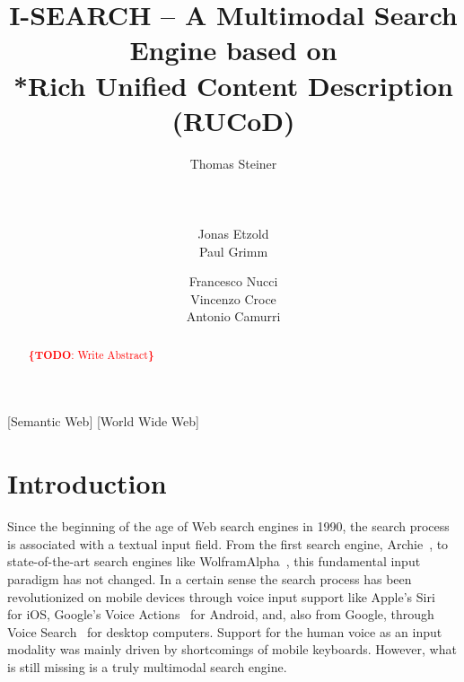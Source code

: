 \documentclass{acm_proc_article-sp}
\newcommand{\todo}[1]{\noindent\textcolor{red}{{\bf \{TODO}: #1{\bf \}}}}
\begin{document}
\title{I-SEARCH -- A Multimodal Search Engine based on\\*Rich Unified Content Description (RUCoD)}

\author{
\alignauthor
Thomas Steiner\\
	\\
	\\
	\\
\alignauthor
Jonas Etzold\\
\alignauthor
Paul Grimm\\	
\and
Francesco Nucci\\
\alignauthor
Vincenzo Croce\\
\alignauthor
Antonio Camurri\\
}

\maketitle

\begin{abstract}
\todo{Write Abstract}
\end{abstract}

[Semantic Web]
[World Wide Web]

\keywords{\todo{Write Keywords}}

\section{Introduction}
Since the beginning of the age of Web search engines in 1990, the search process is associated with a textual input field.
From the first search engine, Archie~\cite{archie}, to state-of-the-art search engines like WolframAlpha~\cite{wolframalpha}, this fundamental input paradigm has not changed.
In a certain sense the search process has been revolutionized on mobile devices through voice input support like Apple's Siri~\cite{siri} for iOS, Google's Voice Actions~\cite{voiceactions} for Android, and, also from Google, through Voice Search~\cite{voicesearch} for desktop computers.
Support for the human voice as an input modality was mainly driven by shortcomings of mobile keyboards.
However, what is still missing is a truly multimodal search engine. 
\end{document}
